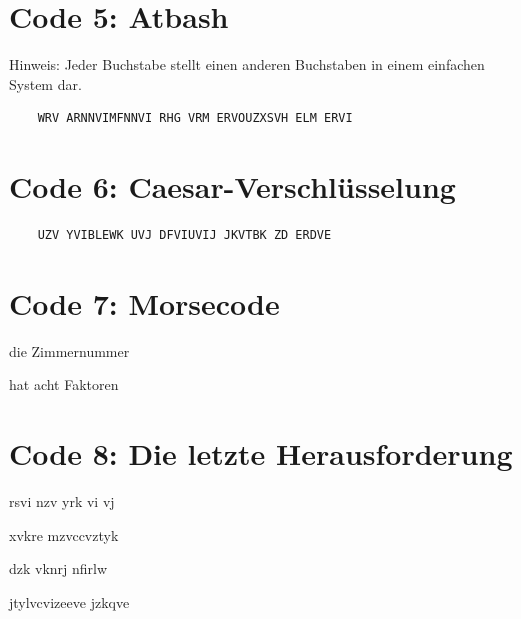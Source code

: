 \documentclass[11pt,a4paper]{report}
\def\lm{\Large\morse}
\begin{document}
\section*{Code 5: Atbash}
Hinweis: Jeder Buchstabe stellt einen anderen Buchstaben in einem einfachen System dar.
\begin{verbatim}
    WRV ARNNVIMFNNVI RHG VRM ERVOUZXSVH ELM ERVI
\end{verbatim}

\section*{Code 6: Caesar-Verschlüsselung}

\begin{verbatim}
    UZV YVIBLEWK UVJ DFVIUVIJ JKVTBK ZD ERDVE
\end{verbatim}

\section*{Code 7: Morsecode}

{\lm die Zimmernummer}

{\lm hat acht Faktoren}

\section*{Code 8: Die letzte Herausforderung}





{\lm rsvi nzv yrk vi vj } 

{\lm xvkre mzvccvztyk }

{\lm dzk vknrj nfirlw}

{\lm  jtylvcvizeeve jzkqve}
\end{document}
